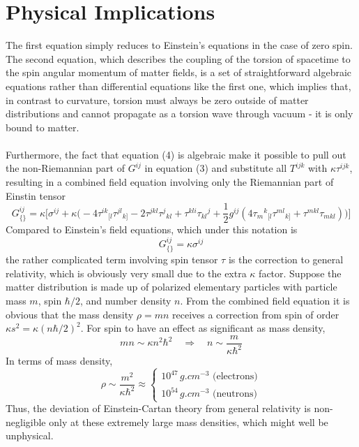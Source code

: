 \documentclass[11pt]{article}
\begin{document}
\section{Physical Implications}
The first equation simply reduces to Einstein's equations in the case of zero spin. The second equation, which describes the coupling of the torsion of spacetime to the spin angular momentum of matter fields, is a set of straightforward algebraic equations rather than differential equations like the first one, which implies that, in contrast to curvature, torsion must always be zero outside of matter distributions and cannot propagate as a torsion wave through vacuum - it is only bound to matter.\\\\
Furthermore, the fact that equation (4) is algebraic make it possible to pull out the non-Riemannian part of $G^{ij}$ in equation (3) and substitute all $T^{ijk}$ with $\kappa\tau^{ijk}$, resulting in a combined field equation involving only the Riemannian part of Einstin tensor\cite{hehl1976general}
\[ G^{ij}_{\{\}}  = \kappa \Bigg[\sigma^{ij} + \kappa\Big( -4\tau^{ik}{}_{[l}\tau^{jl}{}_{k]} 
-2\tau^{jkl}\tau^j{}_{kl} + \tau^{kli}\tau_{kl}{}^j + \frac{1}{2}g^{ij}\left( 4\tau_m{}^k{}_{[l}\tau^{ml}{}_{k]} + \tau^{mkl}\tau_{mkl} \right)\Big) \Bigg] \]
Compared to Einstein's field equations, which under this notation is
\[G^{ij}_{\{\}} = \kappa \sigma^{ij} \]
the rather complicated term involving spin tensor $\tau$ is the correction to general relativity, which is obviously very small due to the extra $\kappa$ factor. Suppose the matter distribution is made up of polarized elementary particles with particle mass $m$, spin $\hbar/2$, and number density $n$. From the combined field equation it is obvious that the mass density $\rho = mn$ receives a correction from spin of order $\kappa s^2 = \kappa (n\hbar/2)^2$. For spin to have an effect as significant as mass density,
\[ mn \sim \kappa n^2\hbar^2 \quad\Rightarrow\quad n \sim \frac{m}{\kappa \hbar^2} \]
In terms of mass density,
\[ \rho \sim \frac{m^2}{\kappa \hbar^2} \approx \begin{cases}
10^{47} \, \si{g.cm^{-3}} \text{ (electrons)} \\
10^{54} \,\si{g.cm^{-3}} \text{ (neutrons)}
\end{cases}\]
Thus, the deviation of Einstein-Cartan theory from general relativity is non-negligible only at these extremely large mass densities, which might well be unphysical. 

{}

\end{document}

